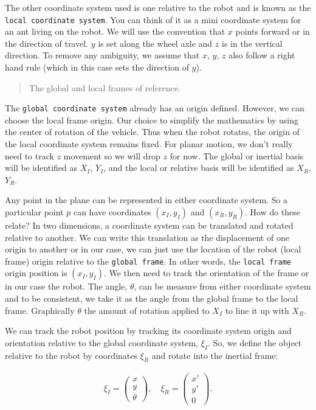The other coordinate system used is one relative to the robot and is
known as the \texttt{local\ coordinate\ system}. You can think of it as
a mini coordinate system for an ant living on the robot. We will use the
convention that \(x\) points forward or in the direction of travel.
\(y\) is set along the wheel axle and \(z\) is in the vertical
direction. To remove any ambiguity, we assume that \(x\), \(y\), \(z\)
also follow a right hand rule (which in this case sets the direction of
\(y\)).

\begin{quote}
The global and local frames of reference.
\end{quote}

The \texttt{global\ coordinate\ system} already has an origin defined.
However, we can choose the local frame origin. Our choice to simplify
the mathematics by using the center of rotation of the vehicle. Thus
when the robot rotates, the origin of the local coordinate system
remains fixed. For planar motion, we don't really need to track \(z\)
movement so we will drop \(z\) for now. The global or inertial basis
will be identified as \(X_I\), \(Y_I\), and the local or relative basis
will be identified as \(X_R\), \(Y_R\).

Any point in the plane can be represented in either coordinate system.
So a particular point \(p\) can have coordinates \((x_I,y_I)\) and
\((x_R, y_R)\). How do these relate? In two dimensions, a coordinate
system can be translated and rotated relative to another. We can write
this translation as the displacement of one origin to another or in our
case, we can just use the location of the robot (local frame) origin
relative to the \texttt{global\ frame}. In other words, the
\texttt{local\ frame} origin position is \((x_I,y_I)\). We then need to
track the orientation of the frame or in our case the robot. The angle,
\(\theta\), can be measure from either coordinate system and to be
consistent, we take it as the angle from the global frame to the local
frame. Graphically \(\theta\) the amount of rotation applied to \(X_I\)
to line it up with \(X_R\).

We can track the robot position by tracking its coordinate system origin
and orientation relative to the global coordinate system, \(\xi_I\). So,
we define the object relative to the robot by coordinates \(\xi_R\) and
rotate into the inertial frame:

\[\begin{aligned}
\xi_I = \begin{pmatrix} x \\ y \\ \theta \end{pmatrix}, \quad \xi_R= \begin{pmatrix} x' \\ y' \\ 0 \end{pmatrix}.
\end{aligned}\]

